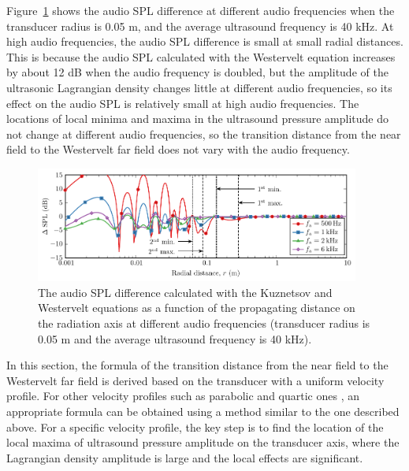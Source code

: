 Figure~\ref{fig:swe:audio_spl:diff_audio_freq} shows the audio SPL difference at different audio frequencies when the transducer radius is 0.05 m, and the average ultrasound frequency is 40 kHz. 
At high audio frequencies, the audio SPL difference is small at small radial distances. 
This is because the audio SPL calculated with the Westervelt equation increases by about 12 dB when the audio frequency is doubled, 
but the amplitude of the ultrasonic Lagrangian density changes little at different audio frequencies, 
so its effect on the audio SPL is relatively small at high audio frequencies. 
The locations of local minima and maxima in the ultrasound pressure amplitude do not change at different audio frequencies, so the transition distance from the near field to the Westervelt far field does not vary with the audio frequency.
\begin{figure}[!htb]
    \centering
    \includegraphics[width = 0.95\textwidth]{Figures/pending/compare_nearfield_radius0p05_ultra40e3_audioVary_200725B}
    \caption{The audio SPL difference calculated with the Kuznetsov and Westervelt equations as a function of the propagating distance on the radiation axis at different audio frequencies (transducer radius is 0.05 m and the average ultrasound frequency is 40 kHz).}
    \label{fig:swe:audio_spl:diff_audio_freq}
\end{figure}

In this section, the formula of the transition distance from the near field to the Westervelt far field is derived based on the transducer with a uniform velocity profile. 
For other velocity profiles such as parabolic and quartic ones \cite{Cervenka2019VersatileComputationalApproach}, an appropriate formula can be obtained using a method similar to the one described above. For a specific velocity profile, the key step is to find the location of the local maxima of ultrasound pressure amplitude on the transducer axis, where the Lagrangian density amplitude is large and the local effects are significant.

